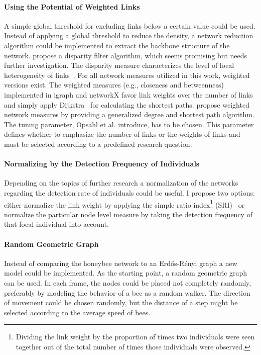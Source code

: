 \paragraph{Using the Potential of Weighted Links}
A simple global threshold for excluding links below a certain value could be used.
Instead of applying a global threshold to reduce the density, a network reduction algorithm could be implemented to extract the backbone structure of the network.
\textcite{serrano2009extracting} propose a disparity filter algorithm, which seems promising but needs further investigation.
The disparity measure characterizes the level of local heterogeneity of links~\cite{barthelemy2003spatial}.
For all network measures utilized in this work, weighted versions exist.
The weighted measures (e.g., closeness and betweenness) implemented in igraph and networkX favor link weights over the number of links and simply apply Dijkstra~\cite{dijkstra1959note} for calculating the shortest paths. \textcite{opsahl2010node} propose weighted network measures by providing a generalized degree and shortest path algorithm. The tuning parameter, Opsahl et al. introduce, has to be chosen. This parameter defines whether to emphasize the number of links or the weights of links and must be selected according to a predefined research question.


\paragraph{Normalizing by the Detection Frequency of Individuals}
Depending on the topics of further research a normalization of the networks regarding the detection rate of individuals could be useful.
I propose two options: either normalize the link weight by applying the simple ratio index\footnote{Dividing the link weight by the proportion of times two individuals were seen together out of the total number of times those individuals were observed.} (SRI)~\cite{formica2012fitness} or normalize the particular node level measure by taking the detection frequency of that focal individual into account.

\paragraph{Random Geometric Graph}
Instead of comparing the honeybee network to an Erd\H{o}s-R\'{e}nyi graph a new model could be implemented.
As the starting point, a random geometric graph~\cite{rgg2002} can be used.
In each frame, the nodes could be placed not completely randomly, preferably by modeling the behavior of a bee as a random walker.
The direction of movement could be chosen randomly, but the distance of a step might be selected according to the average speed of bees.


